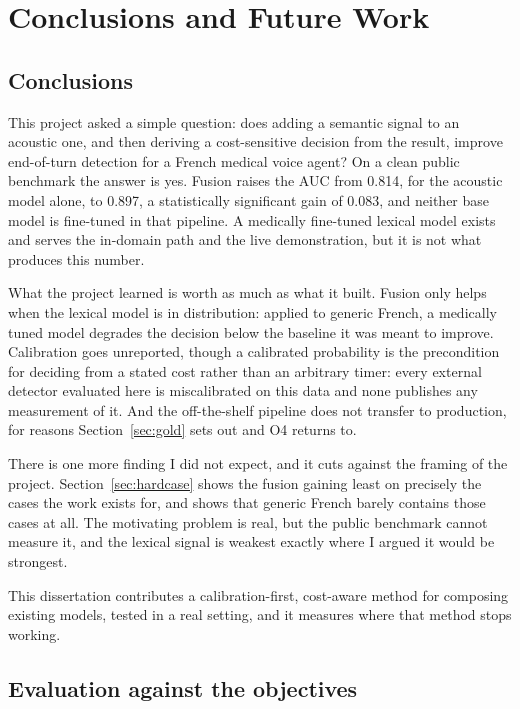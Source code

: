 \chapter{Conclusions and Future Work}
\label{ch:conclusions}

\section{Conclusions}

This project asked a simple question: does adding a semantic signal to an acoustic one, and
then deriving a cost-sensitive decision from the result, improve end-of-turn detection for a
French medical voice agent? On a clean public benchmark the answer is yes. Fusion raises the
AUC from 0.814, for the acoustic model alone, to 0.897, a statistically significant gain of 0.083, and neither base model is fine-tuned in that
pipeline. A medically fine-tuned lexical model exists and serves the in-domain path and the
live demonstration, but it is not what produces this number.

What the project learned is worth as much as what it built. Fusion only helps when the
lexical model is in distribution: applied to generic French, a medically tuned model
degrades the decision below the baseline it was meant to improve. Calibration goes
unreported, though a calibrated probability is the precondition for deciding from a stated
cost rather than an arbitrary timer: every external detector evaluated here is miscalibrated
on this data and none publishes any measurement of it. And the off-the-shelf pipeline does
not transfer to production, for reasons Section~\ref{sec:gold} sets out and O4 returns to.

There is one more finding I did not expect, and it cuts against the framing of the project.
Section~\ref{sec:hardcase} shows the fusion gaining least on precisely the cases the work
exists for, and shows that generic French barely contains those cases at all. The motivating
problem is real, but the public benchmark cannot measure it, and the lexical signal is
weakest exactly where I argued it would be strongest.

This dissertation contributes a calibration-first, cost-aware method for composing existing
models, tested in a real setting, and it measures where that method stops working.

\section{Evaluation against the objectives}

